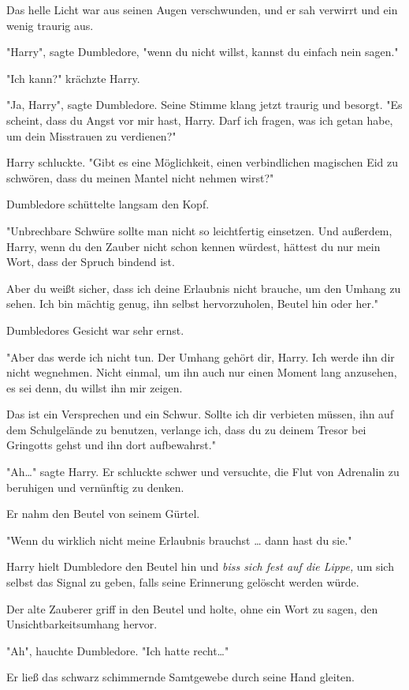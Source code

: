 {Das helle Licht war aus seinen Augen verschwunden, und er sah verwirrt und ein wenig traurig aus.

"Harry", sagte Dumbledore, "wenn du nicht willst, kannst du einfach nein sagen."

"Ich kann?" krächzte Harry.

"Ja, Harry", sagte Dumbledore. Seine Stimme klang jetzt traurig und besorgt. "Es scheint, dass du Angst vor mir hast, Harry. Darf ich fragen, was ich getan habe, um dein Misstrauen zu verdienen?"

Harry schluckte. "Gibt es eine Möglichkeit, einen verbindlichen magischen Eid zu schwören, dass du meinen Mantel nicht nehmen wirst?"

Dumbledore schüttelte langsam den Kopf.

"Unbrechbare Schwüre sollte man nicht so leichtfertig einsetzen. Und außerdem, Harry, wenn du den Zauber nicht schon kennen würdest, hättest du nur mein Wort, dass der Spruch bindend ist.

Aber du weißt sicher, dass ich deine Erlaubnis nicht brauche, um den Umhang zu sehen. Ich bin mächtig genug, ihn selbst hervorzuholen, Beutel hin oder her."

Dumbledores Gesicht war sehr ernst.

"Aber das werde ich nicht tun. Der Umhang gehört dir, Harry. Ich werde ihn dir nicht wegnehmen. Nicht einmal, um ihn auch nur einen Moment lang anzusehen, es sei denn, du willst ihn mir zeigen.

Das ist ein Versprechen und ein Schwur. Sollte ich dir verbieten müssen, ihn auf dem Schulgelände zu benutzen, verlange ich, dass du zu deinem Tresor bei Gringotts gehst und ihn dort aufbewahrst."

"Ah…" sagte Harry. Er schluckte schwer und versuchte, die Flut von Adrenalin zu beruhigen und vernünftig zu denken.

Er nahm den Beutel von seinem Gürtel.

"Wenn du wirklich nicht meine Erlaubnis brauchst … dann hast du sie."

Harry hielt Dumbledore den Beutel hin und \emph{biss sich fest auf die Lippe,} um sich selbst das Signal zu geben, falls seine Erinnerung gelöscht werden würde.

Der alte Zauberer griff in den Beutel und holte, ohne ein Wort zu sagen, den Unsichtbarkeitsumhang hervor.

"Ah", hauchte Dumbledore. "Ich hatte recht…"

Er ließ das schwarz schimmernde Samtgewebe durch seine Hand gleiten.

}
